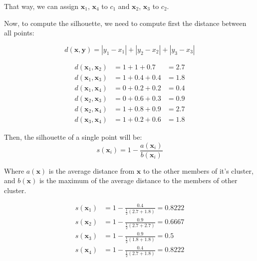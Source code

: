 \documentclass[12pt]{article}
\begin{document}
\begin{enumerate}[leftmargin=\labelsep]
    That way, we can assign $\mathbf{x}_1$, $\mathbf{x}_4$ to $c_1$ and $\mathbf{x}_2$, $\mathbf{x}_3$ to $c_2$.

    Now, to compute the silhouette, we need to compute first the distance between all points:

    \begin{equation}
        d(\mathbf{x}, \mathbf{y}) = |y_1 - x_1| + |y_2 - x_2| + |y_3 - x_3|
    \end{equation}

    \begin{equation}
    \begin{aligned}
        d(\mathbf{x}_1, \mathbf{x}_2) &= 1 + 1   + 0.7 &= 2.7 \\
        d(\mathbf{x}_1, \mathbf{x}_3) &= 1 + 0.4 + 0.4 &= 1.8 \\
        d(\mathbf{x}_1, \mathbf{x}_4) &= 0 + 0.2 + 0.2 &= 0.4 \\
        d(\mathbf{x}_2, \mathbf{x}_3) &= 0 + 0.6 + 0.3 &= 0.9 \\
        d(\mathbf{x}_2, \mathbf{x}_4) &= 1 + 0.8 + 0.9 &= 2.7 \\
        d(\mathbf{x}_3, \mathbf{x}_4) &= 1 + 0.2 + 0.6 &= 1.8
    \end{aligned}
    \end{equation}

    Then, the silhouette of a single point will be:
    \begin{equation}
        s(\mathbf{x}_i) = 1 - \frac{a(\mathbf{x}_i)}{b(\mathbf{x}_i)}
    \end{equation}

    Where $a(\mathbf{x})$ is the average distance from $\mathbf{x}$ to the other members of it's cluster, and $b(\mathbf{x})$ is the maximum of the average distance to the members of other cluster.

    \begin{equation}
    \begin{aligned}
        s(\mathbf{x}_1) &= 1 - \frac{0.4}{\frac{1}{2}(2.7+1.8)} = 0.8222 \\
        s(\mathbf{x}_2) &= 1 - \frac{0.9}{\frac{1}{2}(2.7+2.7)} = 0.6667 \\
        s(\mathbf{x}_3) &= 1 - \frac{0.9}{\frac{1}{2}(1.8+1.8)} = 0.5 \\
        s(\mathbf{x}_4) &= 1 - \frac{0.4}{\frac{1}{2}(2.7+1.8)} = 0.8222
    \end{aligned}
    \end{equation}


\end{enumerate}
\end{document}

